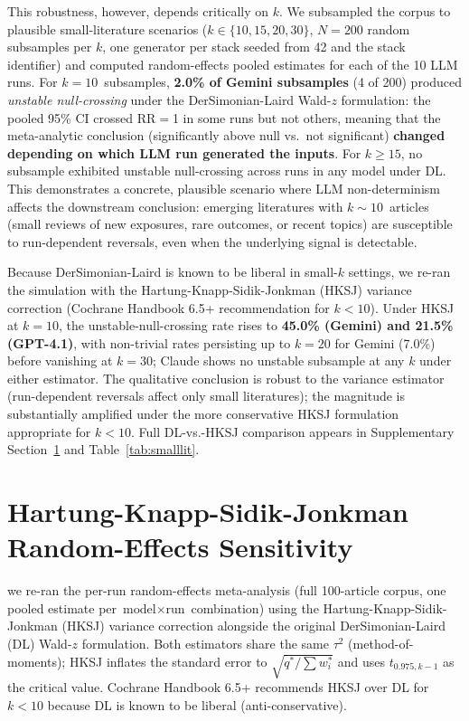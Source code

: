 \documentclass[11pt]{article}
\begin{document}
This robustness, however, depends critically on $k$.
We subsampled the corpus to plausible small-literature scenarios ($k\in\{10,15,20,30\}$, $N{=}200$ random subsamples per $k$, one generator per stack seeded from 42 and the stack identifier) and computed random-effects pooled estimates for each of the 10 LLM runs.
For $k{=}10$~subsamples, \textbf{2.0\% of Gemini subsamples} (4 of 200) produced \emph{unstable null-crossing} under the DerSimonian-Laird Wald-$z$ formulation: the pooled 95\% CI crossed RR${=}$1 in some runs but not others, meaning that the meta-analytic conclusion (significantly above null vs.\ not significant) \textbf{changed depending on which LLM run generated the inputs}.
For $k{\geq}15$, no subsample exhibited unstable null-crossing across runs in any model under DL.
This demonstrates a concrete, plausible scenario where LLM non-determinism affects the downstream conclusion: emerging literatures with $k{\sim}10$~articles (small reviews of new exposures, rare outcomes, or recent topics) are susceptible to run-dependent reversals, even when the underlying signal is detectable.

Because DerSimonian-Laird is known to be liberal in small-$k$ settings, we re-ran the simulation with the Hartung-Knapp-Sidik-Jonkman (HKSJ) variance correction (Cochrane Handbook 6.5+ recommendation for $k{<}10$).
Under HKSJ at $k{=}10$, the unstable-null-crossing rate rises to \textbf{45.0\% (Gemini) and 21.5\% (GPT-4.1)}, with non-trivial rates persisting up to $k{=}20$ for Gemini (7.0\%) before vanishing at $k{=}30$; Claude shows no unstable subsample at any $k$ under either estimator.
The qualitative conclusion is robust to the variance estimator (run-dependent reversals affect only small literatures); the magnitude is substantially amplified under the more conservative HKSJ formulation appropriate for $k{<}10$.
Full DL-vs.-HKSJ comparison appears in Supplementary Section~\ref{sec:hksj_supp} and Table~\ref{tab:smalllit}.


\section{Hartung-Knapp-Sidik-Jonkman Random-Effects Sensitivity}
\label{sec:hksj_supp}

we re-ran the per-run random-effects meta-analysis (full 100-article corpus, one pooled estimate per $\text{model}{\times}\text{run}$ combination) using the Hartung-Knapp-Sidik-Jonkman (HKSJ) variance correction alongside the original DerSimonian-Laird (DL) Wald-$z$ formulation. Both estimators share the same $\tau^2$ (method-of-moments); HKSJ inflates the standard error to $\sqrt{q^{\ast}/\sum w_i^{\ast}}$ and uses $t_{0.975,k-1}$ as the critical value. Cochrane Handbook 6.5+ recommends HKSJ over DL for $k{<}10$ because DL is known to be liberal (anti-conservative).
\end{document}
